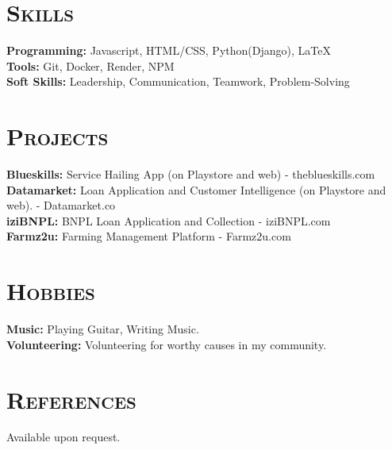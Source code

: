 \documentclass[a4paper,10pt]{article}
\newcommand{\cvsection}[1]{\section*{\scshape{#1}}}
\newcommand{\cvitem}[2]{\textbf{#1:} #2\\}
\begin{document}
\cvsection{Skills}
\cvitem{Programming}{Javascript, HTML/CSS, Python(Django), LaTeX}
\cvitem{Tools}{Git, Docker, Render, NPM}
\cvitem{Soft Skills}{Leadership, Communication, Teamwork, Problem-Solving}

\cvsection{Projects}

\cvitem{Blueskills}{Service Hailing App (on Playstore and web) - theblueskills.com}
\cvitem{Datamarket}{Loan Application and Customer Intelligence (on Playstore and web). - Datamarket.co}
\cvitem{iziBNPL}{BNPL Loan Application and Collection - iziBNPL.com}
\cvitem{Farmz2u}{Farming Management Platform - Farmz2u.com}

\cvsection{Hobbies}
\cvitem{Music}{Playing Guitar, Writing Music.}
\cvitem{Volunteering}{Volunteering for worthy causes in my community.}

\cvsection{References}
Available upon request.
\end{document}
